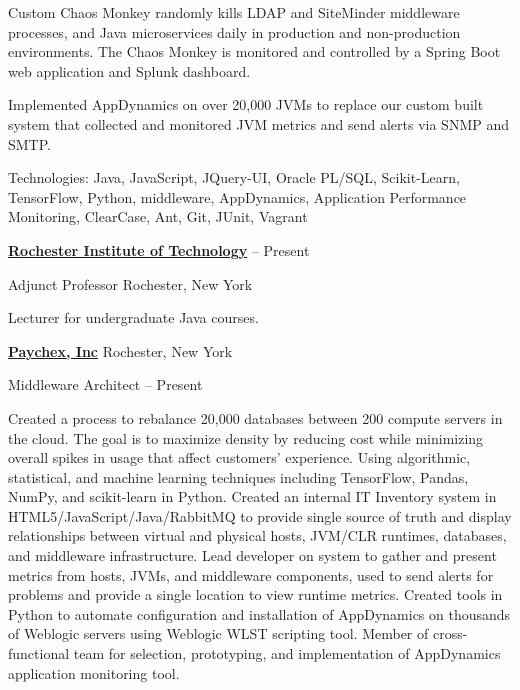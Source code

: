 \documentclass[letterpaper,MMMMyyyy,nonstopmode]{simpleresumecv}
\begin{document}
\begin{Body}
\begin{Detail}
\BulletItem
Custom Chaos Monkey randomly kills LDAP and SiteMinder middleware processes, and Java microservices daily in production and non-production environments. The Chaos Monkey is monitored and controlled by a Spring Boot web application and Splunk dashboard.

\BulletItem
Implemented AppDynamics on over 20,000 JVMs to replace our custom built system that collected and monitored JVM metrics and send alerts via SNMP and SMTP.

\Gap
Technologies: Java, JavaScript, JQuery-UI, Oracle PL/SQL, Scikit-Learn, TensorFlow, Python, middleware, AppDynamics, Application Performance Monitoring, ClearCase, Ant, Git, JUnit, Vagrant
\end{Detail}

\BigGap

\Entry
\href{http://ist.rit.edu/}
{\textbf{Rochester Institute of Technology}}
\hfill
{} --
Present

Adjunct Professor
\hfill 
Rochester, New York

\begin{Detail}
\Item
Lecturer for undergraduate Java courses.
\end{Detail}

\BigGap

\iffalse %
\Entry
\href{http://www.paychex.com/}
{\textbf{Paychex, Inc}}
\hfill 
Rochester, New York

Middleware Architect
\hfill
{} --
Present

\begin{Detail}
\BulletItem
Created a process to rebalance 20,000 databases between 200 compute servers in the cloud. The goal is to maximize density by reducing cost while minimizing overall spikes in usage that affect customers' experience. Using algorithmic, statistical, and machine learning techniques including TensorFlow, Pandas, NumPy, and scikit-learn in Python.
\BulletItem
Created an internal IT Inventory system in HTML5/JavaScript/Java/RabbitMQ to provide single source of truth and display relationships between virtual and physical hosts, JVM/CLR runtimes, databases, and middleware infrastructure.
\BulletItem
Lead developer on system to gather and present metrics from hosts, JVMs, and middleware components, used to send alerts for problems and provide a single location to view runtime metrics.
\BulletItem
Created tools
in Python to automate configuration and installation of AppDynamics on thousands of Weblogic servers using Weblogic WLST
scripting tool.
\BulletItem
Member of cross-functional team for selection, prototyping, and implementation of AppDynamics application monitoring tool. 


\end{Detail}
\end{Body}
\end{document}
